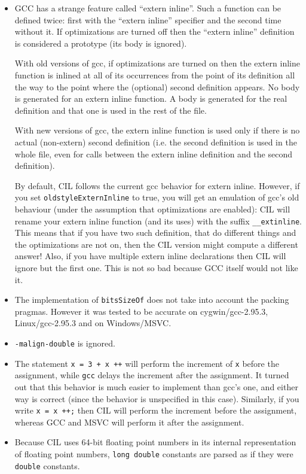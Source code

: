 \documentclass[letterpaper]{article}
\def\t#1{{\tt #1}}
\begin{document}
\begin{itemize}
\item GCC has a strange feature called ``extern inline''. Such a function can
be defined twice: first with the ``extern inline'' specifier and the second
time without it. If optimizations are turned off then the ``extern inline''
definition is considered a prototype (its body is ignored). 

With old versions of gcc, if optimizations
are turned on then the extern inline function is inlined at all of its
occurrences from the point of its definition all the way to the point where the
(optional) second definition appears. No body is generated for an extern
inline function. A body is generated for the real definition and that one is
used in the rest of the file. 

With new versions of gcc, the extern inline function is used only if there is no
actual (non-extern) second definition (i.e. the second definition is used in the
whole file, even for calls between the extern inline definition and the second
definition).

By default, CIL follows the current gcc behavior for extern
inline. However, if you set \t{oldstyleExternInline} to true, you will
get an emulation of gcc's old behaviour (under the assumption that
optimizations are enabled): CIL will rename your extern inline
function (and its uses) with the suffix \t{\_\_extinline}. This means
that if you have two such definition, that do different things and the
optimizations are not on, then the CIL version might compute a
different answer! Also, if you have multiple extern inline
declarations then CIL will ignore but the first one. This is not so
bad because GCC itself would not like it.

\item The implementation of \t{bitsSizeOf} does not take into account the
  packing pragmas. However it was tested to be accurate on cygwin/gcc-2.95.3,
  Linux/gcc-2.95.3 and on Windows/MSVC.

\item \t{-malign-double} is ignored.

\item The statement \t{x = 3 + x ++} will perform the increment of \t{x}
  before the assignment, while \t{gcc} delays the increment after the
  assignment. It turned out that this behavior is much easier to implement
  than gcc's one, and either way is correct (since the behavior is unspecified
  in this case). Similarly, if you write \t{x = x ++;} then CIL will perform
  the increment before the assignment, whereas GCC and MSVC will perform it
  after the assignment. 

\item Because CIL uses 64-bit floating point numbers in its internal
  representation of floating point numbers, \t{long double} constants
  are parsed as if they were \t{double} constants.

\end{itemize}
\end{document}
